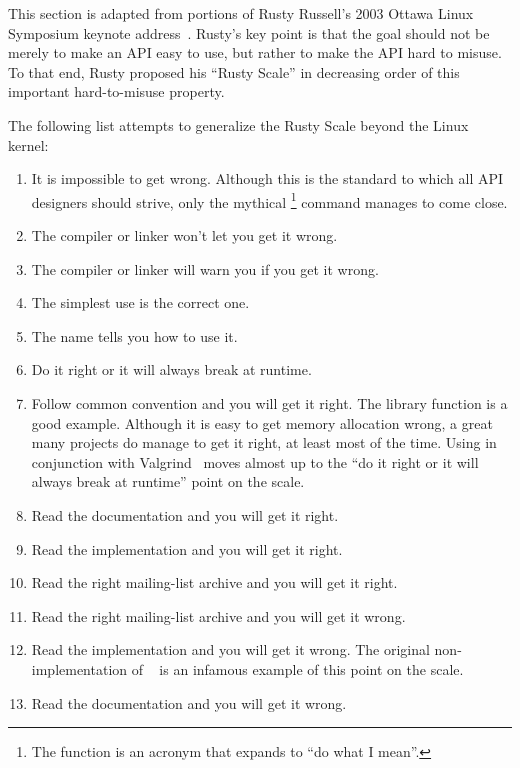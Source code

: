 
This section is adapted from portions of Rusty Russell's 2003 Ottawa Linux
Symposium keynote address~\cite[Slides 39-57]{RustyRussell2003OLSkeynote}.
Rusty's key point is that the goal should not be merely to make an API
easy to use, but rather to make the API hard to misuse.
To that end, Rusty proposed his ``Rusty Scale'' in decreasing order
of this important hard-to-misuse property.

The following list attempts to generalize the Rusty Scale beyond the
Linux kernel:

\begin{enumerate}
\item	It is impossible to get wrong.
	Although this is the standard to which all API designers should
	strive, only the mythical \footnote{
		The  function is an acronym that expands to
		``do what I mean''.}
	command manages to come close.
\item	The compiler or linker won't let you get it wrong.
\item	The compiler or linker will warn you if you get it wrong.
\item	The simplest use is the correct one.
\item	The name tells you how to use it.
\item	Do it right or it will always break at runtime.
\item	Follow common convention and you will get it right.
	The  library function is a good example.
	Although it is easy to get memory allocation wrong, a
	great many projects do manage to get it right, at least most
	of the time.
	Using  in conjunction with
	Valgrind~\cite{ValgrindHomePage} moves 
	almost up to the ``do it right or it will always break at runtime''
	point on the scale.
\item	Read the documentation and you will get it right.
\item	Read the implementation and you will get it right.
\item	Read the right mailing-list archive and you will get it right.
\item	Read the right mailing-list archive and you will get it wrong.
\item	Read the implementation and you will get it wrong.
	The original non- implementation of
	~\cite{PaulEMcKenney2007PreemptibleRCU}
	is an infamous example of this point on the scale.
\item	Read the documentation and you will get it wrong.

\end{enumerate}
